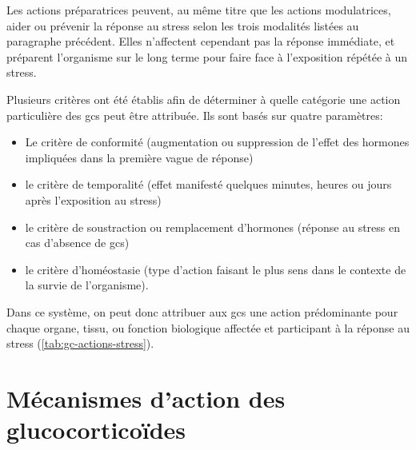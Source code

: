 \documentclass[../main.tex]{subfiles}
\begin{document}
Les actions préparatrices peuvent, au même titre que les actions modulatrices, aider ou prévenir la réponse au stress selon les trois modalités listées au paragraphe précédent.
Elles n'affectent cependant pas la réponse immédiate, et préparent l'organisme sur le long terme pour faire face à l'exposition répétée à un stress.
\par
Plusieurs critères ont été établis afin de déterminer à quelle catégorie une action particulière des \glspl{gc} peut être attribuée.
Ils sont basés sur quatre paramètres:
\begin{itemize}
\item Le critère de conformité (augmentation ou suppression de l'effet des hormones impliquées dans la première vague de réponse)
\item le critère de temporalité (effet manifesté quelques minutes, heures ou jours après l'exposition au stress)
\item le critère de soustraction ou remplacement d'hormones (réponse au stress en cas d'absence de \glspl{gc})
\item le critère d'homéostasie (type d'action faisant le plus sens dans le contexte de la survie de l'organisme).
\end{itemize}
Dans ce système, on peut donc attribuer aux \glspl{gc} une action prédominante pour chaque organe, tissu, ou fonction biologique affectée et participant à la réponse au stress (\autoref{tab:gc-actions-stress}).









\section{Mécanismes d'action des glucocorticoïdes}

\end{document}

